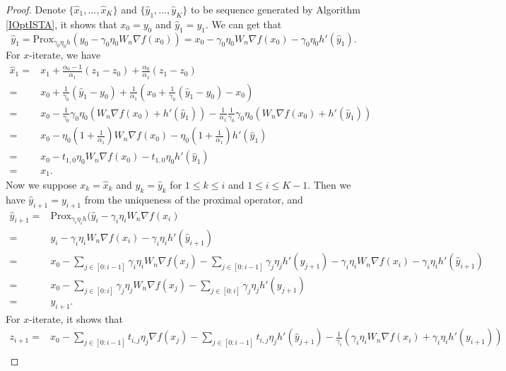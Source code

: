 \documentclass{article}
\begin{document}
\begin{proof}
Denote $\{\hat{x}_{1},\dots, \hat{x}_{K}\}$ and $\{\hat{y}_{1},\dots, \hat{y}_{K}\}$ to be sequence generated by Algorithm \ref{IOptISTA}, it shows that $x_{0}=y_{0}$ and $\hat{y}_{1}=y_{1}$. We can get that
\[
\hat{y}_{1}=\text{Prox}_{\gamma_{0}\eta_{0}h}(y_{0}-\gamma_{0}\eta_{0}W_{n}\nabla f(x_{0}))=x_{0}-\gamma_{0}\eta_{0}W_{n}\nabla f(x_{0})-\gamma_{0}\eta_{0}h'(\hat{y}_{1}).
\]
For $x$-iterate, we have
\begin{align*}
\hat{x}_{1}=&x_{1}+\frac{\alpha_{0}-1}{\alpha_{1}}(z_{1}-z_{0})+\frac{\alpha_{0}}{\alpha_{1}}(z_{1}-z_{0})\\
=&x_{0}+\frac{1}{\gamma_{0}}(\hat{y}_{1}-y_{0})+\frac{1}{\alpha_{1}}(x_{0}+\frac{1}{\gamma_{0}}(\hat{y}_{1}-y_{0})-x_{0})\\
=&x_{0}-\frac{1}{\gamma_{0}}\gamma_{0}\eta_{0}(W_{n}\nabla f(x_{0})+h'(\hat{y}_{1})) -\frac{1}{\alpha_{1}}\frac{1}{\gamma_{0}}\gamma_{0}\eta_{0}(W_{n}\nabla f(x_{0})+h'(\hat{y}_{1}))\\
=& x_{0}-\eta_{0}(1+\frac{1}{\alpha_{1}})W_{n}\nabla f(x_{0}) -\eta_{0}(1+\frac{1}{\alpha_{1}})h'(\hat{y}_{1})\\
=&x_{0}-t_{1,0}\eta_{0}W_{n}\nabla f(x_{0}) -t_{1,0}\eta_{0}h'(\hat{y}_{1})\\
=&x_{1}.
\end{align*}
Now we suppose $x_{k}=\hat{x}_{k}$ and $y_{k}=\hat{y}_{k}$ for $1\le k\le i$ and $1\le i\le K-1$. Then we have $\hat{y}_{i+1}=y_{i+1}$ from the uniqueness of the proximal operator, and 
\begin{align*}
\hat{y}_{i+1}=&\text{Prox}_{\gamma_{i}\eta_{i} h}(\hat{y}_{i}-\gamma_{i}\eta_{i}W_{n}\nabla f(x_{i})\\
=&y_{i}-\gamma_{i}\eta_{i}W_{n}\nabla f(x_{i}) -\gamma_{i}\eta_{i}h'(\hat{y}_{i+1})\\
=&x_{0}-\sum_{j\in[0:i-1]}\gamma_{i}\eta_{i}W_{n}\nabla f(x_{j}) -\sum_{j\in[0:i-1]}\gamma_{j}\eta_{j}h'(y_{j+1})-\gamma_{i}\eta_{i}W_{n}\nabla f(x_{i}) -\gamma_{i}\eta_{i}h'(\hat{y}_{i+1})\\
=&x_{0}-\sum_{j\in[0:i]}\gamma_{j}\eta_{j}W_{n}\nabla f(x_{j})-\sum_{j\in[0:i]}\gamma_{j}\eta_{j}h'(y_{j+1})\\
=&y_{i+1}.
\end{align*}
For $x$-iterate, it shows that
\begin{align*}
z_{i+1}=&x_{0}-\sum_{j\in[0:i-1]}t_{i,j}\eta_{j}\nabla f(x_{j}) -\sum_{j\in[0:i-1]}t_{i,j}\eta_{j}h'(\hat{y}_{j+1}) -\frac{1}{\gamma_{i}}(\gamma_{i}\eta_{i}W_{n}\nabla f(x_{i})+\gamma_{i}\eta_{i}h'(y_{i+1}))\\

\end{align*}
\end{proof}
\end{document}
